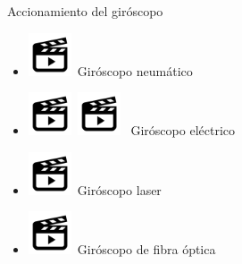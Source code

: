\begin{frame}{Accionamiento del gir\'oscopo}

  \begin{itemize}
  \item
    \href{https://www.youtube.com/watch?v=q2Zgvxn4rSA}{\includegraphics[width=0.1\textwidth]{05.IyA.imagenes/Video.png}}\,
    Gir\'oscopo neum\'atico

  \item     \href{https://www.youtube.com/watch?v=FYSHEhksBjk}{\includegraphics[width=0.1\textwidth]{05.IyA.imagenes/Video.png}}\, 
 \href{https://www.youtube.com/watch?v=VycrS3VYjeM}{\includegraphics[width=0.1\textwidth]{05.IyA.imagenes/Video.png}}
\, Gir\'oscopo el\'ectrico

\item \href{https://www.youtube.com/watch?v=8IYkisyOZvs}{\includegraphics[width=0.1\textwidth]{05.IyA.imagenes/Video.png}}\, Gir\'oscopo laser

\item \href{https://www.youtube.com/watch?v=z62CxCSRMjY}{\includegraphics[width=0.1\textwidth]{05.IyA.imagenes/Video.png}}\, Gir\'oscopo de fibra \'optica

  \end{itemize}

\end{frame}



